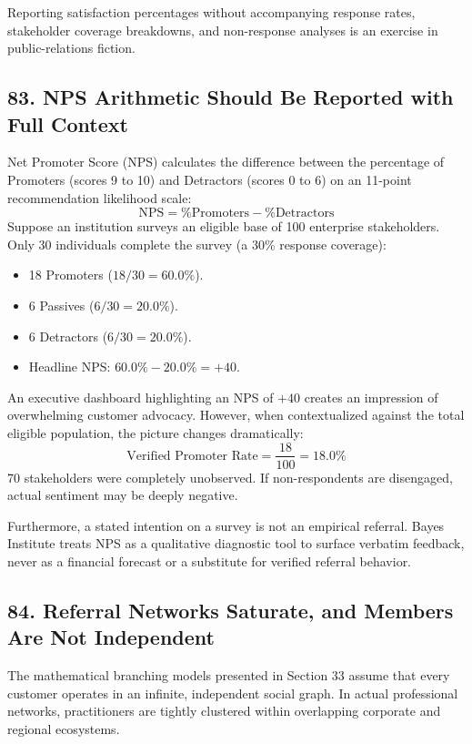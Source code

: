 Reporting satisfaction percentages without accompanying response rates, stakeholder coverage breakdowns, and non-response analyses is an exercise in public-relations fiction.

\subsection*{83. NPS Arithmetic Should Be Reported with Full Context}

Net Promoter Score (NPS) calculates the difference between the percentage of Promoters (scores 9 to 10) and Detractors (scores 0 to 6) on an 11-point recommendation likelihood scale:
\begin{equation}
\text{NPS} = \% \text{Promoters} - \% \text{Detractors}
\end{equation}
Suppose an institution surveys an eligible base of 100 enterprise stakeholders. Only 30 individuals complete the survey (a 30\% response coverage):
\begin{itemize}[leftmargin=*]
\item 18 Promoters ($18 / 30 = 60.0\%$).
\item 6 Passives ($6 / 30 = 20.0\%$).
\item 6 Detractors ($6 / 30 = 20.0\%$).
\item Headline NPS: $60.0\% - 20.0\% = +40$.
\end{itemize}

An executive dashboard highlighting an NPS of $+40$ creates an impression of overwhelming customer advocacy. However, when contextualized against the total eligible population, the picture changes dramatically:
\begin{equation}
\text{Verified Promoter Rate} = \frac{18}{100} = 18.0\%
\end{equation}
70 stakeholders were completely unobserved. If non-respondents are disengaged, actual sentiment may be deeply negative.

Furthermore, a stated intention on a survey is not an empirical referral. Bayes Institute treats NPS as a qualitative diagnostic tool to surface verbatim feedback, never as a financial forecast or a substitute for verified referral behavior.

\subsection*{84. Referral Networks Saturate, and Members Are Not Independent}

The mathematical branching models presented in Section 33 assume that every customer operates in an infinite, independent social graph. In actual professional networks, practitioners are tightly clustered within overlapping corporate and regional ecosystems.

